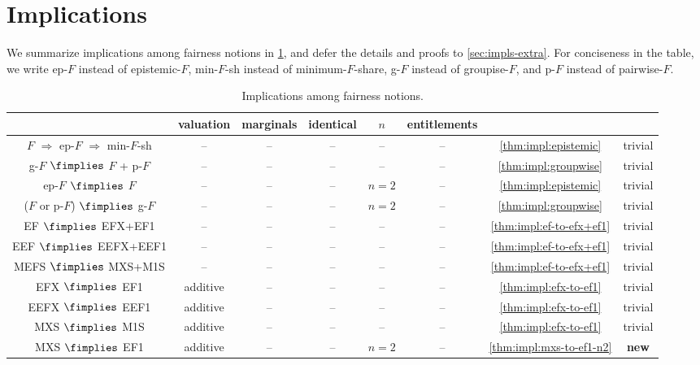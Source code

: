 \section{Implications}
\label{sec:impls}

We summarize implications among fairness notions in \cref{table:impls1},
and defer the details and proofs to \cref{sec:impls-extra}.
%
For conciseness in the table, we write ep-$F$ instead of epistemic-$F$,
min-$F$-sh instead of minimum-$F$-share,
g-$F$ instead of groupise-$F$, and p-$F$ instead of pairwise-$F$.

\footnotesize
\begin{longtable}{cccccccc}
\caption{Implications among fairness notions.}
\label{table:impls1}
\\ \toprule & \tiny valuation & \tiny marginals & \tiny identical & \tiny $n$ & \tiny entitlements & &
\\ \midrule $F$ $\Rightarrow$ ep-$F$ $\Rightarrow$ min-$F$-sh
    & -- & -- & -- & -- & -- & \cref{thm:impl:epistemic} & trivial
\\[\defaultaddspace] g-$F$ $\fimplies$ $F$ + p-$F$
    & -- & -- & -- & -- & -- & \cref{thm:impl:groupwise} & trivial
\\[\defaultaddspace] ep-$F$ $\fimplies$ $F$
    & -- & -- & -- & $n=2$ & -- & \cref{thm:impl:epistemic} & trivial
\\[\defaultaddspace] ($F$ or p-$F$) $\fimplies$ g-$F$
    & -- & -- & -- & $n=2$ & -- & \cref{thm:impl:groupwise} & trivial
%
\\ \midrule EF $\fimplies$ EFX+EF1
    & -- & -- & -- & -- & -- & \cref{thm:impl:ef-to-efx+ef1} & trivial
\\[\defaultaddspace] EEF $\fimplies$ EEFX+EEF1
    & -- & -- & -- & -- & -- & \cref{thm:impl:ef-to-efx+ef1} & trivial
\\[\defaultaddspace] MEFS $\fimplies$ MXS+M1S
    & -- & -- & -- & -- & -- & \cref{thm:impl:ef-to-efx+ef1} & trivial
\\[\defaultaddspace] EFX $\fimplies$ EF1
    & additive & -- & -- & -- & -- & \cref{thm:impl:efx-to-ef1} & trivial
\\[\defaultaddspace] EEFX $\fimplies$ EEF1
    & additive & -- & -- & -- & -- & \cref{thm:impl:efx-to-ef1} & trivial
\\[\defaultaddspace] MXS $\fimplies$ M1S
    & additive & -- & -- & -- & -- & \cref{thm:impl:efx-to-ef1} & trivial
\\[\defaultaddspace] MXS $\fimplies$ EF1
    & additive & -- & -- & $n=2$ & -- & \cref{thm:impl:mxs-to-ef1-n2} & \textbf{new}

\end{longtable}
